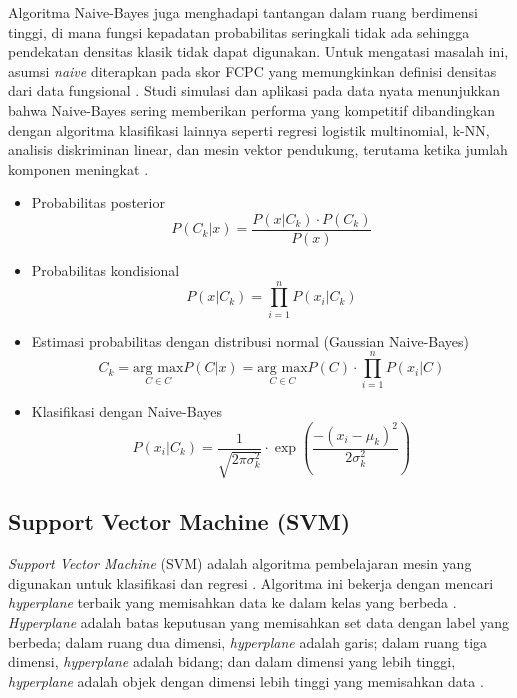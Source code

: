 \documentclass[conference]{IEEEtran}
\begin{document}
Algoritma Naive-Bayes juga menghadapi tantangan dalam ruang berdimensi tinggi, di mana fungsi kepadatan probabilitas seringkali tidak ada sehingga pendekatan densitas klasik tidak dapat digunakan. 
Untuk mengatasi masalah ini, asumsi \textit{naive} diterapkan pada skor FCPC yang memungkinkan definisi densitas dari data fungsional \cite{b18}. Studi simulasi dan aplikasi pada data nyata menunjukkan 
bahwa Naive-Bayes sering memberikan performa yang kompetitif dibandingkan dengan algoritma klasifikasi lainnya seperti regresi logistik multinomial, k-NN, analisis diskriminan linear, dan mesin vektor pendukung, 
terutama ketika jumlah komponen meningkat \cite{b18}.

\begin{itemize}
    \item Probabilitas posterior
        \begin{equation}
            P(C_k | x) = \frac{P(x | C_k) \cdot P(C_k)}{P(x)}
        \end{equation}
    \item Probabilitas kondisional
        \begin{equation}
            P(x | C_k) = \prod_{i=1}^{n} P(x_i | C_k)
        \end{equation}
    \item Estimasi probabilitas dengan distribusi normal (Gaussian Naive-Bayes)
        \begin{equation}
            C_k = \underset{C \in C}{\text{arg max}} P(C | x) = \underset{C \in C}{\text{arg max}} P(C) \cdot \prod_{i=1}^{n} P(x_i | C)
        \end{equation}
    \item Klasifikasi dengan Naive-Bayes
        \begin{equation}
            P(x_i | C_k) = \frac{1}{\sqrt{2 \pi \sigma_k^2}} \cdot \exp \left( \frac{-(x_i - \mu_k)^2}{2 \sigma_k^2} \right)
        \end{equation}
\end{itemize}

\subsection{Support Vector Machine (SVM)}

\textit{Support Vector Machine} (SVM) adalah algoritma pembelajaran mesin yang digunakan untuk klasifikasi dan regresi \cite{b21}. Algoritma ini bekerja dengan mencari 
\textit{hyperplane} terbaik yang memisahkan data ke dalam kelas yang berbeda \cite{b20}. \textit{Hyperplane} adalah batas keputusan yang memisahkan set data dengan label yang berbeda; 
dalam ruang dua dimensi, \textit{hyperplane} adalah garis; dalam ruang tiga dimensi, \textit{hyperplane} adalah bidang; dan dalam dimensi yang lebih tinggi, \textit{hyperplane} adalah objek dengan 
dimensi lebih tinggi yang memisahkan data \cite{b22}.
\end{document}
